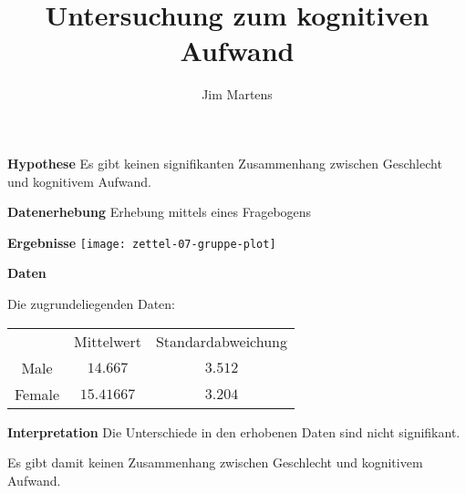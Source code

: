 \documentclass[14pt]{beamer}
\begin{document}
\author{Jim Martens}
\title{\bfseries \color{black}Untersuchung zum kognitiven Aufwand}

\renewcommand{\figurename}{Figure}

\begin{frame}
	\titlepage
\end{frame}

\begin{frame}{\bfseries \color{black}Hypothese}
	Es gibt keinen signifikanten Zusammenhang zwischen Geschlecht und kognitivem Aufwand.
\end{frame}

\begin{frame}{\bfseries \color{black}Datenerhebung}
	Erhebung mittels eines Fragebogens
\end{frame}

\begin{frame}{\bfseries \color{black}Ergebnisse}
	\centering
	\texttt{[image: zettel-07-gruppe-plot]}
\end{frame}

\begin{frame}{\bfseries \color{black}Daten}

Die zugrundeliegenden Daten:

\begin{tabular}{ccc}
	& Mittelwert & Standardabweichung \\
	Male & $14.667$ & $3.512$ \\
	Female & $15.41667$ & $3.204$
\end{tabular}
\end{frame}

\begin{frame}{\bfseries \color{black}Interpretation}
	Die Unterschiede in den erhobenen Daten sind nicht signifikant.
	
	Es gibt damit keinen Zusammenhang zwischen Geschlecht und kognitivem Aufwand.
\end{frame}
\end{document}

